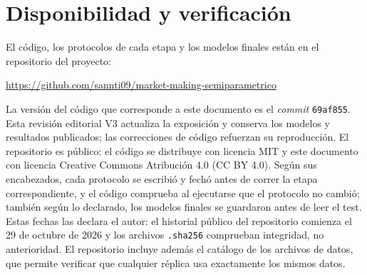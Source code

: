 \section{Disponibilidad y verificación}
El código, los protocolos de cada etapa y los modelos finales están en el repositorio del proyecto:
\begin{center}\url{https://github.com/sannti09/market-making-semiparametrico}\end{center}
 La versión del código que corresponde a este documento es el \textit{commit} \texttt{69af855}. Esta revisión editorial V3 actualiza la exposición y conserva los modelos y resultados publicados; las correcciones de código refuerzan su reproducción. El repositorio es público: el código se distribuye con licencia MIT y este documento con licencia Creative Commons Atribución 4.0 (CC BY 4.0). Según sus encabezados, cada protocolo se escribió y fechó antes de correr la etapa correspondiente, y el código comprueba al ejecutarse que el protocolo no cambió; también según lo declarado, los modelos finales se guardaron antes de leer el test. Estas fechas las declara el autor: el historial público del repositorio comienza el 29 de octubre de 2026 y los archivos \texttt{.sha256} comprueban integridad, no anterioridad. El repositorio incluye además el catálogo de los archivos de datos, que permite verificar que cualquier réplica usa exactamente los mismos datos.
